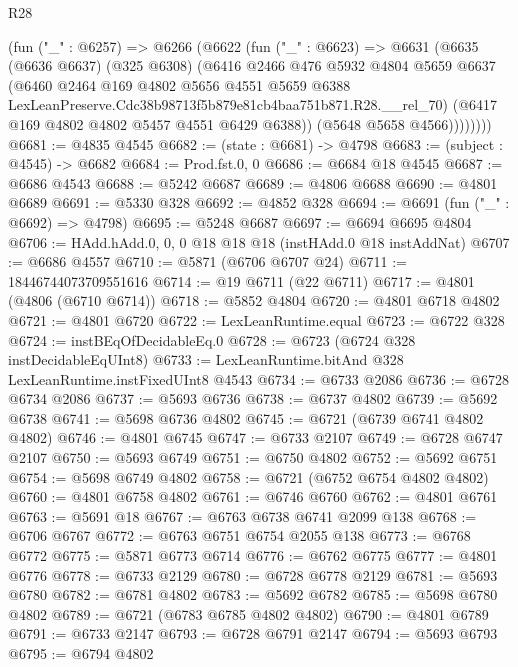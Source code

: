 \begin{lexlean}{R28}
\begin{coremodule}
          (fun ("_" : @6257) =>
          @6266
            (@6622
              (fun ("_" : @6623) =>
              @6631
                (@6635
                  (@6636 @6637)
                  (@325 @6308)
                  (@6416
                    @2466
                    @476
                    @5932
                    @4804
                    @5659
                    @6637
                    (@6460
                      @2464
                      @169
                      @4802
                      @5656
                      @4551
                      @5659
                      @6388
                      LexLeanPreserve.Cdc38b98713f5b879e81cb4baa751b871.R28.__rel_70)
                    (@6417 @169 @4802 @4802 @5457 @4551 @6429 @6388))
                  (@5648 @5658 @4566))))))))
@6681 := @4835 @4545
@6682 := (state : @6681) -> @4798
@6683 := (subject : @4545) -> @6682
@6684 := Prod.fst.{0, 0}
@6686 := @6684 @18 @4545
@6687 := @6686 @4543
@6688 := @5242 @6687
@6689 := @4806 @6688
@6690 := @4801 @6689
@6691 := @5330 @328
@6692 := @4852 @328
@6694 := @6691 (fun ("_" : @6692) => @4798)
@6695 := @5248 @6687
@6697 := @6694 @6695 @4804
@6706 := HAdd.hAdd.{0, 0, 0} @18 @18 @18 (instHAdd.{0} @18 instAddNat)
@6707 := @6686 @4557
@6710 := @5871 (@6706 @6707 @24)
@6711 := 18446744073709551616
@6714 := @19 @6711 (@22 @6711)
@6717 := @4801 (@4806 (@6710 @6714))
@6718 := @5852 @4804
@6720 := @4801 @6718 @4802
@6721 := @4801 @6720
@6722 := LexLeanRuntime.equal
@6723 := @6722 @328
@6724 := instBEqOfDecidableEq.{0}
@6728 := @6723 (@6724 @328 instDecidableEqUInt8)
@6733 := LexLeanRuntime.bitAnd @328 LexLeanRuntime.instFixedUInt8 @4543
@6734 := @6733 @2086
@6736 := @6728 @6734 @2086
@6737 := @5693 @6736
@6738 := @6737 @4802
@6739 := @5692 @6738
@6741 := @5698 @6736 @4802
@6745 := @6721 (@6739 @6741 @4802 @4802)
@6746 := @4801 @6745
@6747 := @6733 @2107
@6749 := @6728 @6747 @2107
@6750 := @5693 @6749
@6751 := @6750 @4802
@6752 := @5692 @6751
@6754 := @5698 @6749 @4802
@6758 := @6721 (@6752 @6754 @4802 @4802)
@6760 := @4801 @6758 @4802
@6761 := @6746 @6760
@6762 := @4801 @6761
@6763 := @5691 @18
@6767 := @6763 @6738 @6741 @2099 @138
@6768 := @6706 @6767
@6772 := @6763 @6751 @6754 @2055 @138
@6773 := @6768 @6772
@6775 := @5871 @6773 @6714
@6776 := @6762 @6775
@6777 := @4801 @6776
@6778 := @6733 @2129
@6780 := @6728 @6778 @2129
@6781 := @5693 @6780
@6782 := @6781 @4802
@6783 := @5692 @6782
@6785 := @5698 @6780 @4802
@6789 := @6721 (@6783 @6785 @4802 @4802)
@6790 := @4801 @6789
@6791 := @6733 @2147
@6793 := @6728 @6791 @2147
@6794 := @5693 @6793
@6795 := @6794 @4802

\end{coremodule}
\end{lexlean}
